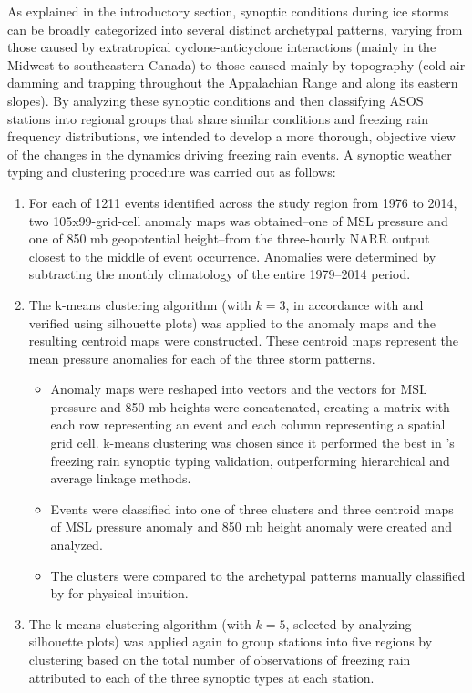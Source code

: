 \documentclass[twocol]{ametsoc}
\begin{document}
As explained in the introductory section, synoptic conditions during ice storms can be broadly categorized into several distinct archetypal patterns, varying from those caused by extratropical cyclone-anticyclone interactions (mainly in the Midwest to southeastern Canada) to those caused mainly by topography (cold air damming and trapping throughout the Appalachian Range and along its eastern slopes). By analyzing these synoptic conditions and then classifying ASOS stations into regional groups that share similar conditions and freezing rain frequency distributions, we intended to develop a more thorough, objective view of the changes in the dynamics driving freezing rain events. A synoptic weather typing and clustering procedure was carried out as follows:
\begin{enumerate}
\item
For each of 1211 events identified across the study region from 1976 to 2014, two 105x99-grid-cell anomaly maps was obtained--one of MSL pressure and one of 850 mb geopotential height--from the three-hourly NARR output closest to the middle of event occurrence. Anomalies were determined by subtracting the monthly climatology of the entire 1979--2014 period. 
\item
The k-means clustering algorithm (with $k=3$, in accordance with \citet{erfani2012automated} and verified using silhouette plots) was applied to the anomaly maps and the resulting centroid maps were constructed. These centroid maps represent the mean pressure anomalies for each of the three storm patterns.
\begin{itemize}
\item
Anomaly maps were reshaped into vectors and the vectors for MSL pressure and 850 mb heights were concatenated, creating a matrix with each row representing an event and each column representing a spatial grid cell. k-means clustering was chosen since it performed the best in \citet{erfani2012automated}'s freezing rain synoptic typing validation, outperforming hierarchical and average linkage methods.
\item
Events were classified into one of three clusters and three centroid maps of MSL pressure anomaly and 850 mb height anomaly were created and analyzed.
\item
The clusters were compared to the archetypal patterns manually classified by \citet{rauber2001synoptic} for physical intuition.
\end{itemize}
\item
The k-means clustering algorithm (with $k=5$, selected by analyzing silhouette plots) was applied again to group stations into five regions by clustering based on the total number of observations of freezing rain attributed to each of the three synoptic types at each station.

\end{enumerate}
\end{document}

